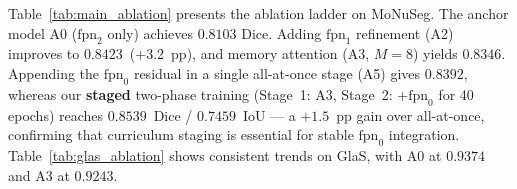 
Table~\ref{tab:main_ablation} presents the ablation ladder on MoNuSeg.
The anchor model A0 ($\text{fpn}_2$ only) achieves $0.8103$ Dice.
Adding $\text{fpn}_1$ refinement (A2) improves to $0.8423$~(+3.2~pp), and memory attention
(A3, $M{=}8$) yields $0.8346$.
Appending the $\text{fpn}_0$ residual in a single all-at-once stage (A5) gives $0.8392$,
whereas our \textbf{staged} two-phase training (Stage~1: A3, Stage~2: +$\text{fpn}_0$ for 40 epochs)
reaches $\mathbf{0.8539}$~Dice / $\mathbf{0.7459}$~IoU --- a $+1.5$~pp gain over all-at-once,
confirming that curriculum staging is essential for stable $\text{fpn}_0$ integration.
Table~\ref{tab:glas_ablation} shows consistent trends on GlaS, with A0 at $0.9374$ and A3 at $0.9243$.
